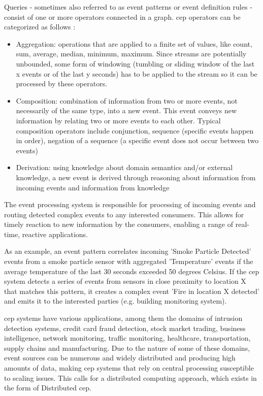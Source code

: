 Queries - sometimes also referred to as event patterns \cite{Luckham2011a} or event definition rules \cite{Cugola2013} - consist of one or more operators connected in a graph. \gls{cep} operators can be categorized as follows \cite{Freudenreich2015}:
\begin{itemize}
\item Aggregation: operations that are applied to a finite set of values, like count, sum, average, median, minimum, maximum. Since streams are potentially unbounded, some form of windowing (tumbling or sliding window of the last x events or of the last y seconds) has to be applied to the stream so it can be processed by these operators.
\item Composition: combination of information from two or more events, not necessarily of the same type, into a new event. This event conveys new information by relating two or more events to each other. Typical composition operators include conjunction, sequence (specific events happen in order), negation of a sequence (a specific event does not occur between two events) \cite{Eckert2009}
\item Derivation: using knowledge about domain semantics and/or external knowledge, a new event is derived through reasoning about information from incoming events and information from knowledge
\end{itemize}

The event processing system is responsible for processing of incoming events and routing detected complex events to any interested consumers.
This allows for timely reaction to new information by the consumers, enabling a range of real-time, reactive applications.

As an example, an event pattern correlates incoming 'Smoke Particle Detected' events from a smoke particle sensor with aggregated 'Temperature' events if the average temperature of the last 30 seconds exceeded 50 degrees Celsius. If the \gls{cep} system detects a series of events from sensors in close proximity to location X that matches this pattern, it creates a complex event 'Fire in location X detected' and emits it to the interested parties (e.g. building monitoring system). 

\gls{cep} systems have various applications, among them the  domains of intrusion detection systems, credit card fraud detection, stock market trading, business intelligence, network monitoring, traffic monitoring, healthcare, transportation, supply chains and manufacturing. Due to the nature of some of these domains, event sources can be numerous and widely distributed and producing high amounts of data, making \gls{cep} systems that rely on central processing susceptible to scaling issues. This calls for a distributed computing approach, which exists in the form of Distributed \gls{cep}.

